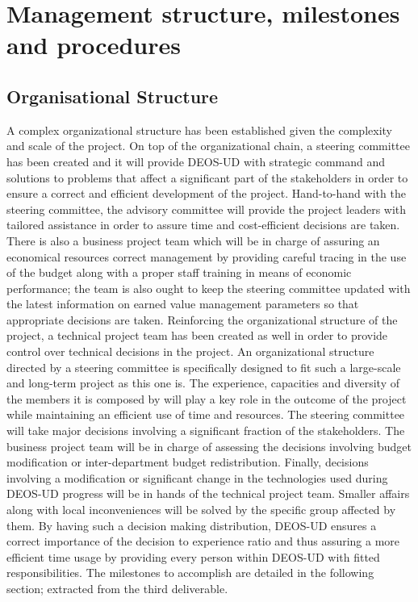 \section{Management structure, milestones and procedures}

\subsection{Organisational Structure}

A complex organizational structure has been established given the complexity and scale of the project. On top of the organizational chain, a steering committee has been created and it will provide DEOS-UD with strategic command and solutions to problems that affect a significant part of the stakeholders in order to ensure a correct and efficient development of the project. Hand-to-hand with the steering committee, the advisory committee will provide the project leaders with tailored assistance in order to assure time and cost-efficient decisions are taken. There is also a business project team which will be in charge of assuring an economical resources correct management by providing careful tracing in the use of the budget along with a proper staff training in means of economic performance; the team is also ought to keep the steering committee updated with the latest information on earned value management parameters so that appropriate decisions are taken. Reinforcing the organizational structure of the project, a technical project team has been created as well in order to provide control over technical decisions in the project.
An organizational structure directed by a steering committee is specifically designed to fit such a large-scale and long-term project as this one is. The experience, capacities and diversity of the members it is composed by will play a key role in the outcome of the project while maintaining an efficient use of time and resources. The steering committee will take major decisions involving a significant fraction of the stakeholders. The business project team will be in charge of assessing the decisions involving budget modification or inter-department budget redistribution. Finally, decisions involving a modification or significant change in the technologies used during DEOS-UD progress will be in hands of the technical project team. Smaller affairs along with local inconveniences will be solved by the specific group affected by them. By having such a decision making distribution, DEOS-UD ensures a correct importance of the decision to experience ratio and thus assuring a more efficient time usage by providing every person within DEOS-UD with fitted responsibilities.
The milestones to accomplish are detailed in the following section; extracted from the third deliverable.      

